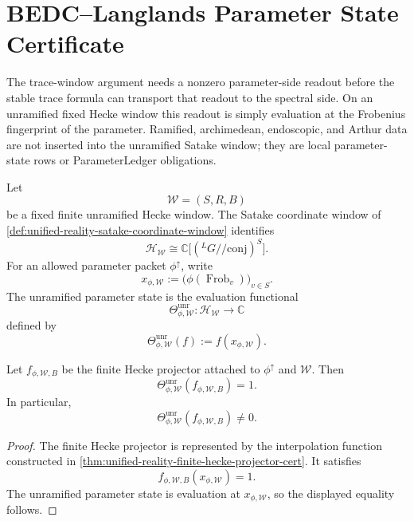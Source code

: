 \section{BEDC--Langlands Parameter State Certificate}
\label{sec:unified-reality-bedc-langlands-parameter-state-cert}

The trace-window argument needs a nonzero parameter-side readout before
the stable trace formula can transport that readout to the spectral
side. On an unramified fixed Hecke window this readout is simply
evaluation at the Frobenius fingerprint of the parameter. Ramified,
archimedean, endoscopic, and Arthur data are not inserted into the
unramified Satake window; they are local parameter-state rows or
ParameterLedger obligations.

\begin{definition}
\label{def:unified-reality-unramified-parameter-state}
Let
$$
\mathcal W=(S,R,B)
$$
be a fixed finite unramified Hecke window. The Satake coordinate window
of \autoref{def:unified-reality-satake-coordinate-window} identifies
$$
\mathcal H_{\mathcal W}
\cong
\mathbb C\bigl[({}^LG/\!/\mathrm{conj})^S\bigr].
$$
For an allowed parameter packet $\phi^{\uparrow}$, write
$$
x_{\phi,\mathcal W}
:=
\bigl(\phi(\operatorname{Frob}_v)\bigr)_{v\in S}.
$$
The unramified parameter state is the evaluation functional
$$
\Theta_{\phi,\mathcal W}^{\mathrm{unr}}:
\mathcal H_{\mathcal W}\to\mathbb C
$$
defined by
$$
\Theta_{\phi,\mathcal W}^{\mathrm{unr}}(f)
:=
f(x_{\phi,\mathcal W}).
$$
\end{definition}

\begin{theorem}
\label{thm:unified-reality-unramified-parameter-state-nonzero}
Let $f_{\phi,\mathcal W,B}$ be the finite Hecke projector attached to
$\phi^{\uparrow}$ and $\mathcal W$. Then
$$
\Theta_{\phi,\mathcal W}^{\mathrm{unr}}(f_{\phi,\mathcal W,B})=1.
$$
In particular,
$$
\Theta_{\phi,\mathcal W}^{\mathrm{unr}}(f_{\phi,\mathcal W,B})\ne0.
$$
\end{theorem}
\begin{proof}
The finite Hecke projector is represented by the interpolation function
constructed in
\autoref{thm:unified-reality-finite-hecke-projector-cert}. It satisfies
$$
f_{\phi,\mathcal W,B}(x_{\phi,\mathcal W})=1.
$$
The unramified parameter state is evaluation at
$x_{\phi,\mathcal W}$, so the displayed equality follows.
\end{proof}

